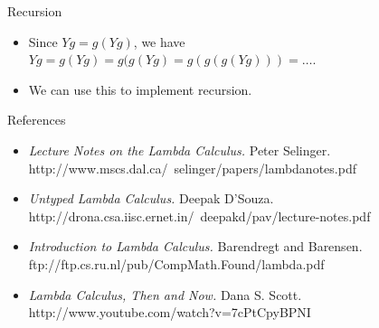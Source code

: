 \documentclass{beamer}
\begin{document}
\begin{frame}{Recursion}
\begin{itemize}
\item Since $Yg = g(Yg)$, we have $Yg = g(Yg) = g(g(Yg) = g(g(g(Yg))) = \ldots$.
\item We can use this to implement recursion.
\end{itemize}
\end{frame}


\begin{frame}{References}
\begin{itemize}
\item \emph{Lecture Notes on the Lambda Calculus.} Peter Selinger.
http://www.mscs.dal.ca/~selinger/papers/lambdanotes.pdf
\item \emph{Untyped Lambda Calculus.} Deepak D'Souza. http://drona.csa.iisc.ernet.in/~deepakd/pav/lecture-notes.pdf
\item \emph{Introduction to Lambda Calculus.} Barendregt and Barensen.
ftp://ftp.cs.ru.nl/pub/CompMath.Found/lambda.pdf
\item \emph{Lambda Calculus, Then and Now.} Dana S. Scott. http://www.youtube.com/watch?v=7cPtCpyBPNI
\end{itemize}
\end{frame}
\end{document}
